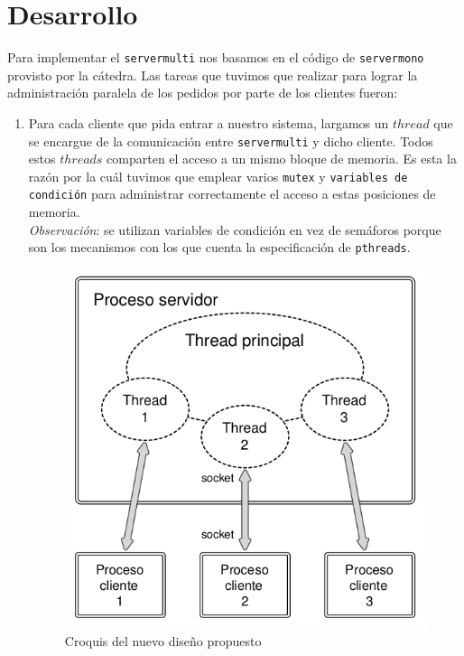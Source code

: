\documentclass[11pt, a4paper, twoside]{article}
\begin{document}
\section{Desarrollo}
Para implementar el \texttt{servermulti} nos basamos en el código de \texttt{servermono} provisto por la
cátedra. Las tareas que tuvimos que realizar para lograr la administración paralela de los pedidos por
parte de los clientes fueron:
\begin{enumerate}
\item Para cada cliente que pida entrar a nuestro sistema, largamos un $thread$ que se encargue de la
  comunicación entre \texttt{servermulti} y dicho cliente. Todos estos $threads$ comparten el acceso a un
  mismo bloque de memoria. Es esta la razón por la cuál tuvimos que emplear varios \texttt{mutex} y \texttt{variables de condición}
  para administrar correctamente el acceso a estas posiciones de memoria.
\\ \textit{Observación}: se utilizan variables de condición en vez de semáforos porque son los mecanismos con los que cuenta la especificación de \texttt{pthreads}.

\begin{figure}[H]
\centering
\includegraphics[scale=0.66]{esquema-workers.png}
\caption{Croquis del nuevo diseño propuesto}
\end{figure}




\end{enumerate}
\end{document}
